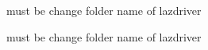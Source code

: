 
\begin{DoxyRefList}
\item[\label{todo__todo000001}%
\hypertarget{todo__todo000001}{}%
Member \hyperlink{dyliblazurite_8cpp_a32e367ee7377a6df4761bcfbb56407e1}{lazurite\+\_\+init} (void)]must be change folder name of lazdriver 

must be change folder name of lazdriver 
\end{DoxyRefList}